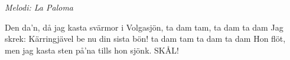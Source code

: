 {\footnotesize\textit{Melodi: La Paloma}}\par
\vspace{10pt}
Den da'n, då jag kasta svärmor i Volgasjön, ta dam tam, ta dam ta dam
Jag skrek: Kärringjävel be nu din sista bön! ta dam tam ta dam ta dam
Hon flöt, men jag kasta sten på'na tills hon sjönk.
SKÅL!

